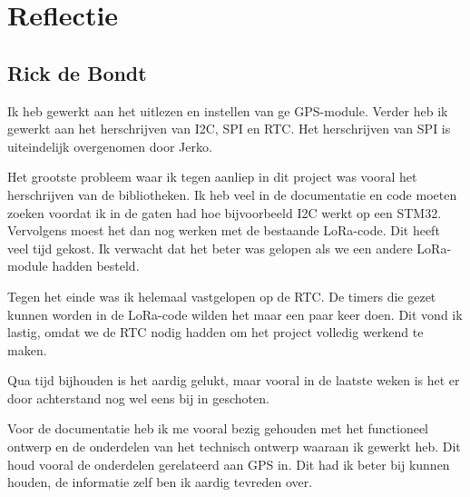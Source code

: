 \section{Reflectie}

\subsection{Rick de Bondt}
Ik heb gewerkt aan het uitlezen en instellen van ge GPS-module. Verder heb ik
gewerkt aan het herschrijven van I2C, SPI en RTC. Het herschrijven van SPI is
uiteindelijk overgenomen door Jerko.

Het grootste probleem waar ik tegen aanliep in dit project was vooral het
herschrijven van de bibliotheken. Ik heb veel in de documentatie en code moeten
zoeken voordat ik in de gaten had hoe bijvoorbeeld I2C werkt op een STM32.
Vervolgens moest het dan nog werken met de bestaande LoRa-code. Dit heeft veel
tijd gekost. Ik verwacht dat het beter was gelopen als we een andere LoRa-module
hadden besteld.

Tegen het einde was ik helemaal vastgelopen op de RTC. De timers
die gezet kunnen worden in de LoRa-code wilden het maar een paar keer doen. Dit
vond ik lastig, omdat we de RTC nodig hadden om het project volledig werkend te
maken.

Qua tijd bijhouden is het aardig gelukt, maar vooral in de laatste weken is het
er door achterstand nog wel eens bij in geschoten.

Voor de documentatie heb ik me vooral bezig gehouden met het functioneel ontwerp
en de onderdelen van het technisch ontwerp waaraan ik gewerkt heb. Dit houd
vooral de onderdelen gerelateerd aan GPS in. Dit had ik beter bij kunnen houden,
de informatie zelf ben ik aardig tevreden over.
